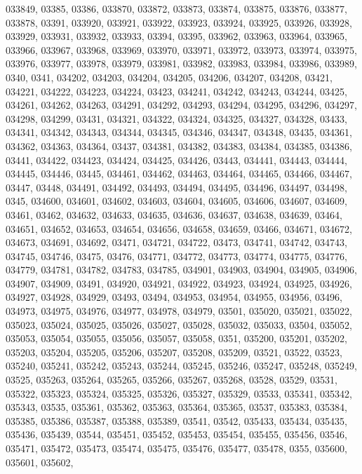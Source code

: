 {033849,
03385,
03386,
033870,
033872,
033873,
033874,
033875,
033876,
033877,
033878,
03391,
033920,
033921,
033922,
033923,
033924,
033925,
033926,
033928,
033929,
033931,
033932,
033933,
03394,
03395,
033962,
033963,
033964,
033965,
033966,
033967,
033968,
033969,
033970,
033971,
033972,
033973,
033974,
033975,
033976,
033977,
033978,
033979,
033981,
033982,
033983,
033984,
033986,
033989,
0340,
0341,
034202,
034203,
034204,
034205,
034206,
034207,
034208,
03421,
034221,
034222,
034223,
034224,
03423,
034241,
034242,
034243,
034244,
03425,
034261,
034262,
034263,
034291,
034292,
034293,
034294,
034295,
034296,
034297,
034298,
034299,
03431,
034321,
034322,
034324,
034325,
034327,
034328,
03433,
034341,
034342,
034343,
034344,
034345,
034346,
034347,
034348,
03435,
034361,
034362,
034363,
034364,
03437,
034381,
034382,
034383,
034384,
034385,
034386,
03441,
034422,
034423,
034424,
034425,
034426,
03443,
034441,
034443,
034444,
034445,
034446,
03445,
034461,
034462,
034463,
034464,
034465,
034466,
034467,
03447,
03448,
034491,
034492,
034493,
034494,
034495,
034496,
034497,
034498,
0345,
034600,
034601,
034602,
034603,
034604,
034605,
034606,
034607,
034609,
03461,
03462,
034632,
034633,
034635,
034636,
034637,
034638,
034639,
03464,
034651,
034652,
034653,
034654,
034656,
034658,
034659,
03466,
034671,
034672,
034673,
034691,
034692,
03471,
034721,
034722,
03473,
034741,
034742,
034743,
034745,
034746,
03475,
03476,
034771,
034772,
034773,
034774,
034775,
034776,
034779,
034781,
034782,
034783,
034785,
034901,
034903,
034904,
034905,
034906,
034907,
034909,
03491,
034920,
034921,
034922,
034923,
034924,
034925,
034926,
034927,
034928,
034929,
03493,
03494,
034953,
034954,
034955,
034956,
03496,
034973,
034975,
034976,
034977,
034978,
034979,
03501,
035020,
035021,
035022,
035023,
035024,
035025,
035026,
035027,
035028,
035032,
035033,
03504,
035052,
035053,
035054,
035055,
035056,
035057,
035058,
0351,
035200,
035201,
035202,
035203,
035204,
035205,
035206,
035207,
035208,
035209,
03521,
03522,
03523,
035240,
035241,
035242,
035243,
035244,
035245,
035246,
035247,
035248,
035249,
03525,
035263,
035264,
035265,
035266,
035267,
035268,
03528,
03529,
03531,
035322,
035323,
035324,
035325,
035326,
035327,
035329,
03533,
035341,
035342,
035343,
03535,
035361,
035362,
035363,
035364,
035365,
03537,
035383,
035384,
035385,
035386,
035387,
035388,
035389,
03541,
03542,
035433,
035434,
035435,
035436,
035439,
03544,
035451,
035452,
035453,
035454,
035455,
035456,
03546,
035471,
035472,
035473,
035474,
035475,
035476,
035477,
035478,
0355,
035600,
035601,
035602,
}
